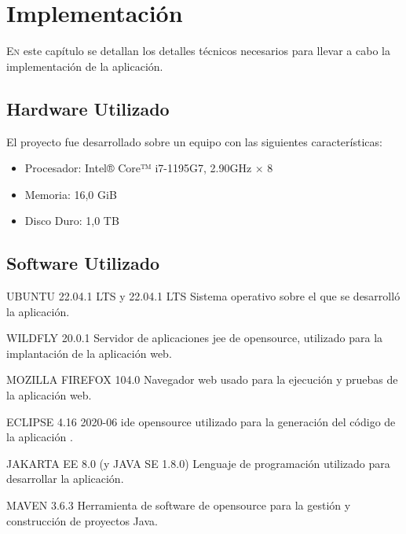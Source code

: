 \chapter{Implementación}
\label{chap:implementacion}


\lettrine{E}{n} este capítulo se detallan los detalles técnicos necesarios para llevar a cabo la implementación de la aplicación.


\section{Hardware Utilizado}
\label{sec:hw}
El proyecto fue desarrollado sobre un equipo con las siguientes características:
\begin{itemize}
\item Procesador: Intel® Core™ i7-1195G7, 2.90GHz × 8
\item Memoria: 16,0 GiB
\item Disco Duro: 1,0 TB
\end{itemize}
	

\section{Software Utilizado}
\label{sec:sw}	

 UBUNTU 22.04.1 LTS y 22.04.1 LTS\newline
 Sistema operativo sobre el que se desarrolló la aplicación.
\newline
 
 WILDFLY 20.0.1\newline
 Servidor de aplicaciones \acrshort{jee} de \gls{opensource}, utilizado para la implantación de la aplicación web.
 \newline
 
 MOZILLA FIREFOX 104.0\newline
 Navegador web usado para la ejecución y pruebas de la aplicación web.
\newline
 
 ECLIPSE 4.16 2020-06\newline
 \acrfull{ide} \gls{opensource} utilizado para la generación del código de la aplicación .
\newline
 
 JAKARTA EE 8.0 (y JAVA SE 1.8.0)\newline
 Lenguaje de programación utilizado para desarrollar la aplicación.
\newline
 
 MAVEN 3.6.3\newline
 Herramienta de software de \gls{opensource} para la gestión y construcción de proyectos Java.
 \newline

